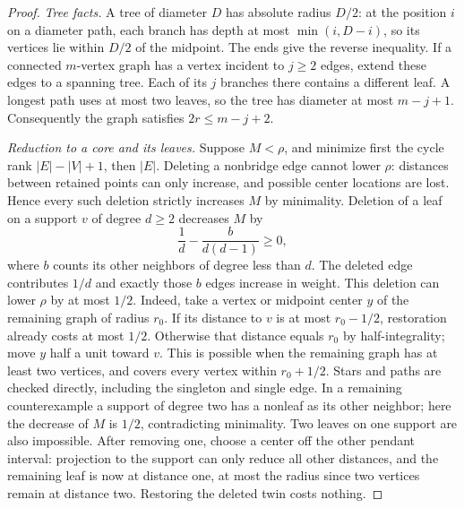 \documentclass[11pt,a4paper]{article}
\begin{document}
\begin{proof}
\emph{Tree facts.} A tree of diameter $D$ has absolute radius $D/2$:
at the position $i$ on a diameter path, each branch has depth at most
$\min(i,D-i)$, so its vertices lie within $D/2$ of the midpoint.
The ends give the reverse inequality. If a connected $m$-vertex graph
has a vertex incident to $j\ge2$ edges, extend these edges to a spanning
tree. Each of its $j$ branches there contains a different leaf. A longest
path uses at most two leaves, so the tree has diameter at most $m-j+1$.
Consequently the graph satisfies $2r\le m-j+2$.

\emph{Reduction to a core and its leaves.} Suppose $M<\rho$, and minimize
first the cycle rank $|E|-|V|+1$, then $|E|$. Deleting a nonbridge
edge cannot lower $\rho$: distances between retained points can only
increase, and possible center locations are lost. Hence every such deletion
strictly increases $M$ by minimality. Deletion of a leaf on a support
$v$ of degree $d\ge2$ decreases $M$ by
\[
 \frac1d-\frac{b}{d(d-1)}\ge0,
\]
where $b$ counts its other neighbors of degree less than $d$.
The deleted edge contributes $1/d$ and exactly those $b$ edges
increase in weight. This deletion can lower $\rho$ by at most $1/2$.
Indeed, take a vertex or midpoint center $y$ of the remaining graph of
radius $r_0$. If its distance to $v$ is at most $r_0-1/2$, restoration
already costs at most $1/2$. Otherwise that distance equals $r_0$
by half-integrality; move $y$ half a unit toward $v$. This is possible
when the remaining graph has at least two vertices, and covers every
vertex within $r_0+1/2$. Stars and paths are checked directly, including
the singleton and single edge. In a remaining counterexample a support
of degree two has a nonleaf as its other neighbor; here the decrease
of $M$ is $1/2$, contradicting minimality. Two leaves on one support
are also impossible. After removing one, choose a center off the other
pendant interval: projection to the support can only reduce all other
distances, and the remaining leaf is now at distance one, at most
the radius since two vertices remain at distance two. Restoring the
deleted twin costs nothing.


\end{proof}
\end{document}
